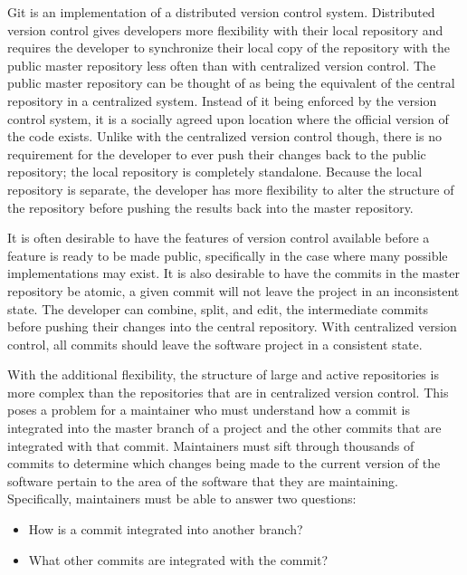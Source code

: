 Git is an implementation of a distributed version control system.
Distributed version control gives developers more flexibility with their
local repository and requires the developer to synchronize their local
copy of the repository with the public master repository less often
than with centralized version control.
The public master repository can be thought of as being the equivalent
of the central repository in a centralized system.
Instead of it being enforced by the version control system,
it is a socially agreed upon location where the official version of the
code exists.
Unlike with the centralized version control though,
there is no requirement for the developer to ever push their changes
back to the public repository;
the local repository is completely standalone.
Because the local repository is separate, the developer has more
flexibility to alter the structure of the repository before pushing
the results back into the master repository.

It is often desirable to have the features of version control available
before a feature is ready to be made public, specifically in the case
where many possible implementations may exist.
It is also desirable to have the commits in the master repository be
atomic, a given commit will not leave the project in an inconsistent
state.
The developer can combine, split, and edit, the intermediate commits
before pushing their changes into the central repository.
With centralized version control, all commits should leave the software
project in a consistent state.

With the additional flexibility, the structure of large and active
repositories is more complex than the repositories that are in
centralized version control. This poses a problem for a maintainer who
must understand how a commit is integrated into the master branch of a
project and the other commits that are integrated with that commit.
Maintainers must sift through thousands of commits to determine which
changes being made to the current version of the software pertain to
the area of the software that they are maintaining.
Specifically, maintainers must be able to answer two questions:

\begin{textbox}
\begin{itemize}
  \item How is a commit integrated into another branch?
  \item What other commits are integrated with the commit?
\end{itemize}
\end{textbox}

